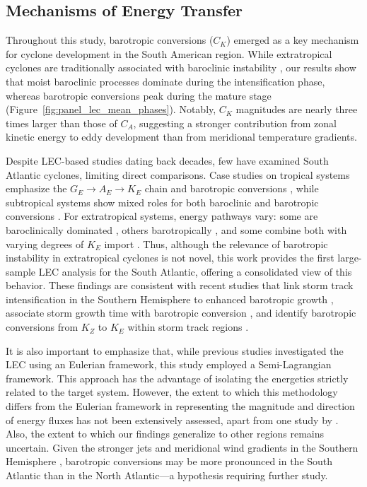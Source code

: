\documentclass[pdflatex,sn-chicago]{sn-jnl}%
\theoremstyle{plain}
\theoremstyle{definition}
\theoremstyle{remark}
\theoremstyle{definition}
\begin{document}
\subsection{Mechanisms of Energy Transfer}

Throughout this study, barotropic conversions ($C_K$) emerged as a key mechanism for cyclone development in the South American region. While extratropical cyclones are traditionally associated with baroclinic instability \citep{bjerknes1922life,charney1964growth,hoskins1990existence}, our results show that moist baroclinic processes dominate during the intensification phase, whereas barotropic conversions peak during the mature stage (Figure~\ref{fig:panel_lec_mean_phases}). Notably, $C_K$ magnitudes are nearly three times larger than those of $C_A$, suggesting a stronger contribution from zonal kinetic energy to eddy development than from meridional temperature gradients.

Despite LEC-based studies dating back decades, few have examined South Atlantic cyclones, limiting direct comparisons. Case studies on tropical systems emphasize the $G_E \rightarrow A_E \rightarrow K_E$ chain and barotropic conversions \citep{brennan1980zonal,veiga2008analysis}, while subtropical systems show mixed roles for both baroclinic and barotropic conversions \citep{michaelides1987limited,dias2013synoptic,pezza2014large,cavicchia2018energetics}. For extratropical systems, energy pathways vary: some are baroclinically dominated \citep{dias2011energy,black2013universal}, others barotropically \citep{michaelides1992spatial,dias2011energy}, and some combine both with varying degrees of $K_E$ import \citep{wahab2002mechanism,bulic2006limited,pezza2010environmental}. Thus, although the relevance of barotropic instability in extratropical cyclones is not novel, this work provides the first large-sample LEC analysis for the South Atlantic, offering a consolidated view of this behavior. These findings are consistent with recent studies that link storm track intensification in the Southern Hemisphere to enhanced barotropic growth \citep{chemke2022intensification}, associate storm growth time with barotropic conversion \citep{hadas2025lagrangian}, and identify barotropic conversions from $K_Z$ to $K_E$ within storm track regions \citep{liu2024systematic}.

It is also important to emphasize that, while previous studies investigated the LEC using an Eulerian framework, this study employed a Semi-Lagrangian framework. This approach has the advantage of isolating the energetics strictly related to the target system. However, the extent to which this methodology differs from the Eulerian framework in representing the magnitude and direction of energy fluxes has not been extensively assessed, apart from one study by \citet{michaelides1999quasi}. Also, the extent to which our findings generalize to other regions remains uncertain. Given the stronger jets and meridional wind gradients in the Southern Hemisphere \citep[e.g.,][]{swart2019canadian,jain2023monsoon,savita2023assessment}, barotropic conversions may be more pronounced in the South Atlantic than in the North Atlantic—a hypothesis requiring further study.
\end{document}

